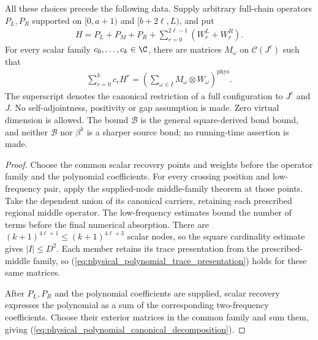 \begin{lemma}
    All these choices precede the following data. Supply arbitrary full-chain
    operators $P_L,P_R$ supported on $[0,a+1)$ and
    $[b+2\ell,L)$, and put
    \begin{align}
        H=P_L+P_M+P_R+\sum_{r=0}^{2\ell-1}(W^L_r+W^R_r).
        \label{eq:physical_polynomial_hamiltonian}
    \end{align}
    For every scalar family $c_0,\ldots,c_k\in\C$, there are matrices
    $M_\omega$ on $\mathcal C(J^c)$ such that
    \begin{align}
        \sum_{r=0}^{k}c_rH^r
        =\left(\sum_{\omega\in I}M_\omega\otimes W_\omega\right)^{\mathrm{phys}}.
        \label{eq:physical_polynomial_canonical_decomposition}
    \end{align}
    The superscript denotes the canonical restriction of a full configuration
    to $J^c$ and $J$. No self-adjointness, positivity or gap assumption is made.
    Zero virtual dimension is allowed. The bound $\mathcal B$ is the general
    square-derived bond bound, and neither $\mathcal B$ nor $\beta^k$ is a
    sharper source bond; no running-time assertion is made.
\end{lemma}
\begin{proof}\leanok
    Choose the common scalar recovery points and weights before the operator
    family and the polynomial coefficients. For every crossing position and
    low-frequency pair, apply the supplied-node middle-family theorem at those
    points. Take the dependent union of its canonical carriers, retaining each
    prescribed regional middle operator. The low-frequency estimates bound the
    number of terms before the final numerical absorption. There are
    $(k+1)^{4\ell+1}\le(k+1)^{4\ell+3}$ scalar nodes, so the square
    cardinality estimate gives $|I|\le D^2$. Each member retains its trace
    presentation from the prescribed-middle family, so
    (\ref{eq:physical_polynomial_trace_presentation}) holds for these same
    matrices.

    After $P_L,P_R$ and the polynomial coefficients are supplied, scalar
    recovery expresses the polynomial as a sum of the corresponding
    two-frequency coefficients. Choose their exterior matrices in the common
    family and sum them, giving
    (\ref{eq:physical_polynomial_canonical_decomposition}).
\end{proof}

